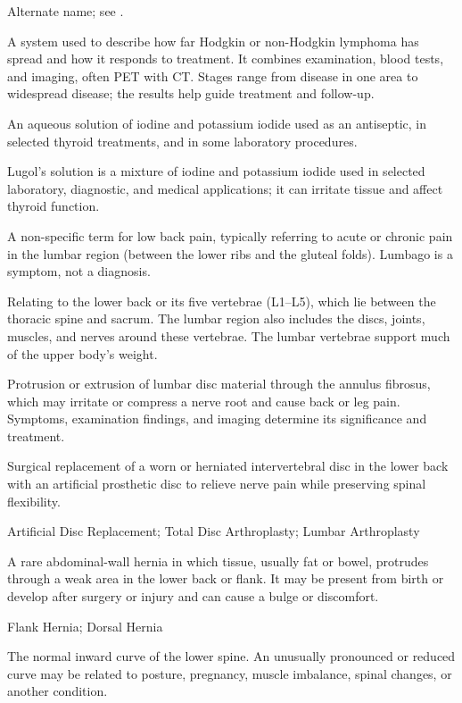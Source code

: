  Alternate name; see .

 A system used to describe how far Hodgkin or non-Hodgkin lymphoma has spread and how it responds to treatment. It combines examination, blood tests, and imaging, often PET with CT. Stages range from disease in one area to widespread disease; the results help guide treatment and follow-up.

 An aqueous solution of iodine and potassium iodide used as an antiseptic, in selected thyroid treatments, and in some laboratory procedures.

 Lugol's solution is a mixture of iodine and potassium iodide used in selected laboratory, diagnostic, and medical applications; it can irritate tissue and affect thyroid function.

 A non-specific term for low back pain, typically referring to acute or chronic pain in
the lumbar region (between the lower ribs and the gluteal folds). Lumbago is a symptom,
not a diagnosis.

 Relating to the lower back or its five vertebrae (L1--L5), which lie between the thoracic spine and sacrum. The lumbar region also includes the discs, joints, muscles, and nerves around these vertebrae. The lumbar vertebrae support much of the upper body's weight.

 Protrusion or extrusion of lumbar disc material through the annulus fibrosus, which may irritate or
compress a nerve root and cause back or leg pain. Symptoms, examination findings, and
imaging determine its significance and treatment.

 Surgical replacement of a worn or herniated intervertebral disc in the lower back with an artificial prosthetic disc to relieve nerve pain while preserving spinal flexibility.

\synonyms
Artificial Disc Replacement; Total Disc Arthroplasty; Lumbar Arthroplasty

 A rare abdominal-wall hernia in which tissue, usually fat or bowel, protrudes through a weak area in the lower back or flank. It may be present from birth or develop after surgery or injury and can cause a bulge or discomfort.

\synonyms
Flank Hernia; Dorsal Hernia

 The normal inward curve of the lower spine. An unusually pronounced or reduced curve may be related to posture, pregnancy, muscle imbalance, spinal changes, or another condition.

